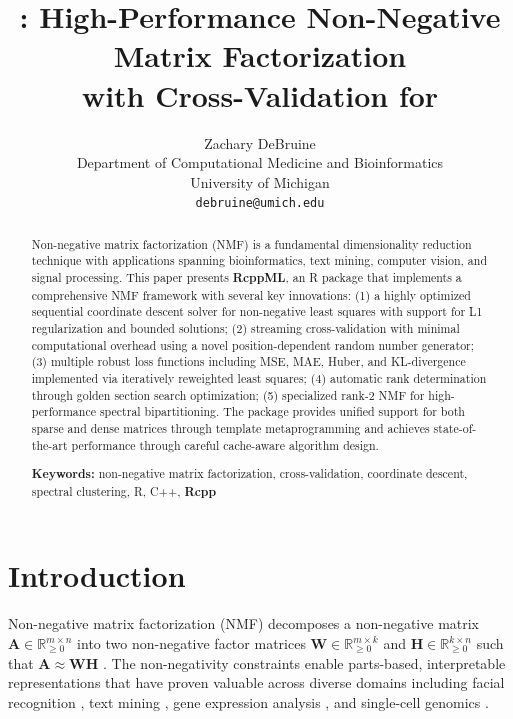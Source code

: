\documentclass[11pt]{article}
\title{\pkg{RcppML}: High-Performance Non-Negative Matrix Factorization\\
with Cross-Validation for \proglang{R}}
\author{Zachary DeBruine\\
Department of Computational Medicine and Bioinformatics\\
University of Michigan\\
\texttt{debruine@umich.edu}}
\date{}
\newcommand{\proglang}[1]{\textsf{#1}}
\newcommand{\pkg}[1]{\textbf{#1}}
\begin{document}
\maketitle

\begin{abstract}
Non-negative matrix factorization (NMF) is a fundamental dimensionality 
reduction technique with applications spanning bioinformatics, text mining, 
computer vision, and signal processing. This paper presents \pkg{RcppML}, an 
\proglang{R} package that implements a comprehensive NMF framework with several 
key innovations: (1) a highly optimized sequential coordinate descent solver for 
non-negative least squares with support for L1 regularization and bounded 
solutions; (2) streaming cross-validation with minimal computational overhead 
using a novel position-dependent random number generator; (3) multiple robust 
loss functions including MSE, MAE, Huber, and KL-divergence implemented via 
iteratively reweighted least squares; (4) automatic rank determination through 
golden section search optimization; (5) specialized rank-2 NMF for 
high-performance spectral bipartitioning. The package provides unified support 
for both sparse and dense matrices through template metaprogramming and achieves 
state-of-the-art performance through careful cache-aware algorithm design.

\vspace{1em}
\noindent\textbf{Keywords:} non-negative matrix factorization, cross-validation, coordinate 
descent, spectral clustering, \proglang{R}, \proglang{C++}, \pkg{Rcpp}
\end{abstract}


\section{Introduction} \label{sec:introduction}

Non-negative matrix factorization (NMF) decomposes a non-negative matrix 
$\mathbf{A} \in \mathbb{R}_{\geq 0}^{m \times n}$ into two non-negative factor 
matrices $\mathbf{W} \in \mathbb{R}_{\geq 0}^{m \times k}$ and 
$\mathbf{H} \in \mathbb{R}_{\geq 0}^{k \times n}$ such that 
$\mathbf{A} \approx \mathbf{W}\mathbf{H}$ \citep{Lee1999}. The non-negativity 
constraints enable parts-based, interpretable representations that have proven 
valuable across diverse domains including facial recognition \citep{Lee1999}, 
text mining \citep{Xu2003}, gene expression analysis \citep{Brunet2004}, and 
single-cell genomics \citep{Kotliar2019}.
\end{document}
